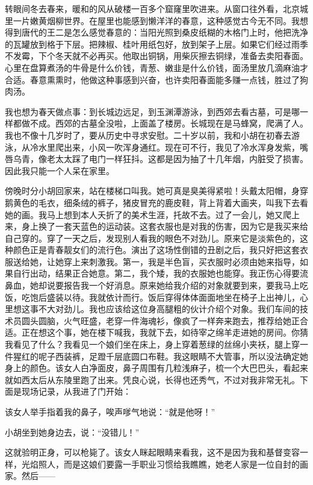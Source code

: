 转眼间冬去春来，暖和的风从破楼一百多个窟窿里吹进来。从窗口往外看，北京城里一片嫩黄烟柳世界。在屋里也能感到懒洋洋的春意，这种感觉古今无不同。我想得到唐代的王二是怎么感觉春意的：当阳光照到桑皮纸糊的木格门上时，他把洗净的瓦罐放到格于下层。把辣椒、桂叶用纸包好，放到架子上层。如果它们经过雨季不发霉，下个冬天就不必再买。他取出铜锅，用柴灰擦去铜绿，准备去卖阳春面。心里在盘算煮汤的牛骨是什么价钱，青葱、嫩韭是什么价钱，面汤里放几滴麻油才合适。春意熏熏时，他做这种事感到兴奋，也许卖阳春面能多赚一点钱，胜过了狗肉汤。 

我也想为春天做点事：到长城边远足，到玉渊潭游泳，到西郊去看古墓，可是哪一样都做不成。西郊的古墓全没啦，上面盖了楼房。长城现在是马蜂窝，爬满了人。我也不像十几岁时了，要从历史中寻求安慰。二十岁以前，我和小胡在初春去游泳，从冷水里爬出来，小风一吹浑身通红。现在可不行，我见了冷水浑身发紫，嘴唇乌青，像老太太踩了电门一样狂抖。这都是因为抽了十几年烟，内脏受了损害。因此我只能一个人呆在家里。 

傍晚时分小胡回家来，站在楼梯口叫我。她可真是臭美得紧啦！头戴太阳帽，身穿鹅黄色的毛衣，细条绒的裤子，猪皮冒充的鹿皮鞋，背上背着大画夹，叫我下去看她的画。我马上想到本人夭折了的美术生涯，托故不去。过了一会儿，她又爬上来，身上换了一套天蓝色的运动装。这套衣服也是对我的伤害，因为它是我买来给自己穿的。穿了一天之后，发现别人看我的眼色不对劲儿。原来它是淡紫色的，这种颜色正是青春靓女们的流行色。演出了这场性倒错的丑剧之后，我只好把这套衣服送给她，让她穿上来刺激我。第一，我是半色盲，买衣服时必须由她来指导，如果自行出动，结果正合她意。第二，我个矮，我的衣服她也能穿。我正伤心得要流鼻血，她却说要报告我一个好消息。原来她给我介绍的对象就要到来，要我马上吃饭，吃饱后盛装以待。我就依计而行。饭后穿得体体面面地坐在椅子上出神儿，心里想这事不大对劲儿。我也应该给这位身高腿粗的伙计介绍个对象。我们车间的技术员圆头圆脑，火气旺盛，老穿一件海魂衫，像疯了一样奔来跑去，推荐给她正合适。正在想这个事，她在楼下喊我，我就下去，如待宰之绵羊走进她的房间。你猜我看见了什么？我看见一个娘们坐在床上，身上穿着葱绿的丝绵小夹袄，腿上穿一件猩红的呢子西装裤，足蹬千层底圆口布鞋。我这眼睛不大管事，所以没法确定她身上的颜色。该女人白净面皮，鼻子周围有几粒浅麻子，梳一个大巴巴头，看起来就如西太后从东陵里跑了出来。凭良心说，长得也还秀气，不过对我非常无礼。下面是现场记录，从我进了门开始： 

该女人举手指着我的鼻子，唉声嗲气地说：“就是他呀！” 

小胡坐到她身边去，说：“没错儿！” 

这就验明正身，可以枪毙了。该女人眯起眼睛来看我，这不是因为我和基督变容一样，光焰照人，而是这娘们要露一手职业习惯给我瞧瞧，她老人家是一位自封的画家。然后—— 

